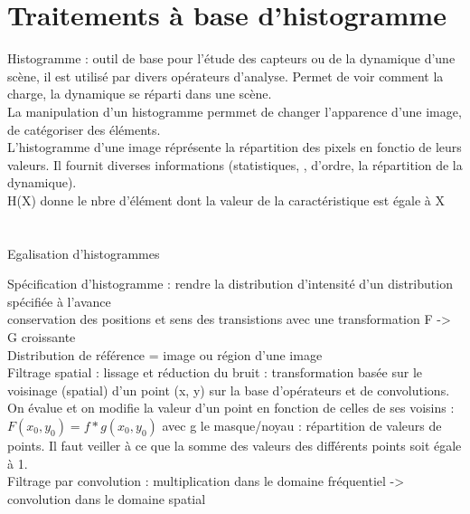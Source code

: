 \documentclass[11pt]{article}
\begin{document}
\newpage

\section{Traitements à base d'histogramme}

Histogramme : outil de base pour l'étude des capteurs ou de la dynamique d'une scène, il est utilisé par divers opérateurs d'analyse. Permet de voir comment la charge, la dynamique se réparti dans une scène.\\

La manipulation d'un histogramme permmet de changer l'apparence d'une image, de catégoriser des éléments.\\

L'histogramme d'une image réprésente la répartition des pixels en fonctio de leurs valeurs. Il fournit diverses informations (statistiques, , d'ordre, la répartition de la dynamique).\\

H(X) donne le nbre d'élément dont la valeur de la caractéristique est égale à X

\vskip 2cm

\section{}

Egalisation d'histogrammes 

\vskip 1cm

Spécification d'histogramme : rendre la distribution d'intensité d'un distribution spécifiée à l'avance\\
conservation des positions et sens des transistions avec une transformation F -> G croissante\\
Distribution de référence = image ou région d'une image\\

Filtrage spatial : lissage et réduction du bruit : transformation basée sur le voisinage (spatial) d'un point (x, y) sur la base d'opérateurs et de convolutions.\\
On évalue et on modifie la valeur d'un point en fonction de celles de ses voisins : $F(x_0, y_0) = f * g(x_0, y_0)$ avec g le masque/noyau : répartition de valeurs de points. Il faut veiller à ce que la somme des valeurs des différents points soit égale à 1.\\

Filtrage par convolution : multiplication dans le domaine fréquentiel -> convolution dans le domaine spatial\\
\end{document}
